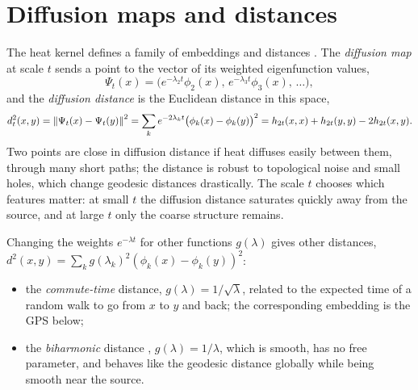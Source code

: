 \section{Diffusion maps and distances}

The heat kernel defines a family of embeddings and distances \citep{Coifman2006}. The \emph{diffusion
map} at scale $t$ sends a point to the vector of its weighted eigenfunction values,
\begin{equation}
\Psi_t(x)=\bigl(e^{-\lambda_2t}\phi_2(x),\,e^{-\lambda_3t}\phi_3(x),\,\dots\bigr),
\end{equation}
and the \emph{diffusion distance} is the Euclidean distance in this space,
\begin{equation}
d_t^2(x,y)=\left\lVert \Psi_t(x)-\Psi_t(y)\right\rVert^2=\sum_ke^{-2\lambda_kt}\bigl(\phi_k(x)-\phi_k(y)\bigr)^2
=h_{2t}(x,x)+h_{2t}(y,y)-2h_{2t}(x,y) .
\end{equation}
Two points are close in diffusion distance if heat diffuses easily between them, through many short
paths; the distance is robust to topological noise and small holes, which change geodesic distances
drastically. The scale $t$ chooses which features matter: at small $t$ the diffusion distance saturates
quickly away from the source, and at large $t$ only the coarse structure remains.

Changing the weights $e^{-\lambda t}$ for other functions $g(\lambda)$ gives other distances,
$d^2(x,y)=\sum_kg(\lambda_k)^2(\phi_k(x)-\phi_k(y))^2$:
\begin{itemize}
  \item the \emph{commute-time} distance, $g(\lambda)=1/\sqrt\lambda$, related to the expected time of a
  random walk to go from $x$ to $y$ and back; the corresponding embedding is the GPS below;
  \item the \emph{biharmonic} distance \citep{Lipman2010}, $g(\lambda)=1/\lambda$, which is smooth, has
  no free parameter, and behaves like the geodesic distance globally while being smooth near the
  source.
\end{itemize}


